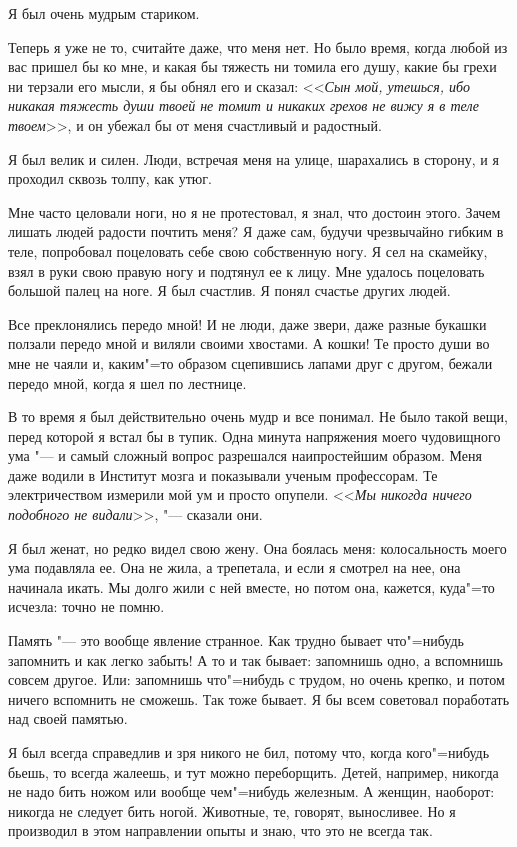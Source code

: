 \setlength{\parindent}{1.25 cm}
Я был очень мудрым стариком.

Теперь я уже не то, считайте даже, что меня нет. Но было время, когда любой из вас пришел бы ко мне, и какая бы тяжесть ни томила его душу, какие бы грехи ни терзали его мысли, я бы обнял его и сказал: <<\textit{Сын мой, утешься, ибо никакая тяжесть души твоей не томит и никаких грехов не вижу я в теле твоем}>>, и он убежал бы от меня счастливый и радостный.

Я был велик и силен. Люди, встречая меня на улице, шарахались в сторону, и я проходил сквозь толпу, как утюг.

Мне часто целовали ноги, но я не протестовал, я знал, что достоин этого. Зачем лишать людей радости почтить меня? Я даже сам, будучи чрезвычайно гибким в теле, попробовал поцеловать себе свою собственную ногу. Я сел на скамейку, взял в руки свою правую ногу и подтянул ее к лицу. Мне удалось поцеловать большой палец на ноге. Я был счастлив. Я понял счастье других людей.

Все преклонялись передо мной! И не люди, даже звери, даже разные букашки ползали передо мной и виляли своими хвостами. А кошки! Те просто души во мне не чаяли и, каким"=то образом сцепившись лапами друг с другом, бежали передо мной, когда я шел по лестнице.

В то время я был действительно очень мудр и все понимал. Не было такой вещи, перед которой я встал бы в тупик. Одна минута напряжения моего чудовищного ума "--- и самый сложный вопрос разрешался наипростейшим образом. Меня даже водили в Институт мозга и показывали ученым профессорам. Те электричеством измерили мой ум и просто опупели. <<\textit{Мы никогда ничего подобного не видали}>>, "--- сказали они.

Я был женат, но редко видел свою жену. Она боялась меня: колосальность моего ума подавляла ее. Она не жила, а трепетала, и если я смотрел на нее, она начинала икать. Мы долго жили с ней вместе, но потом она, кажется, куда"=то исчезла: точно не помню.

Память "--- это вообще явление странное. Как трудно бывает что"=нибудь запомнить и как легко забыть! А то и так бывает: запомнишь одно, а вспомнишь совсем другое. Или: запомнишь что"=нибудь с трудом, но очень крепко, и потом ничего вспомнить не сможешь. Так тоже бывает. Я бы всем советовал поработать над своей памятью.

Я был всегда справедлив и зря никого не бил, потому что, когда кого"=нибудь бьешь, то всегда жалеешь, и тут можно переборщить. Детей, например, никогда не надо бить ножом или вообще чем"=нибудь железным. А женщин, наоборот: никогда не следует бить ногой. Животные, те, говорят, выносливее. Но я производил в этом направлении опыты и знаю, что это не всегда так.

